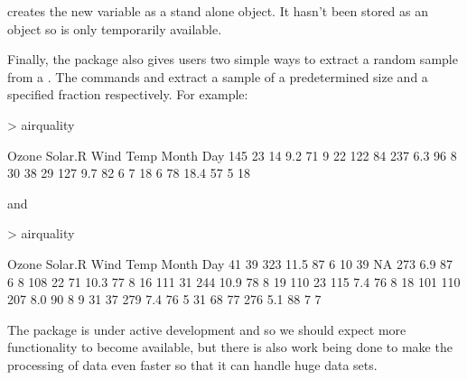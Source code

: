 creates the new variable as a stand alone object. It hasn't been stored as an object so is only temporarily available.  
 
Finally, the  package also gives users two simple ways to extract a random sample from a . The commands  and   
extract a sample of a predetermined size and a specified fraction respectively. For example: 

\begin{Schunk}
\begin{Sinput}
> airquality %>% sample_n(4) 
\end{Sinput}
\begin{Soutput}
    Ozone Solar.R Wind Temp Month Day
145    23      14  9.2   71     9  22
122    84     237  6.3   96     8  30
38     29     127  9.7   82     6   7
18      6      78 18.4   57     5  18
\end{Soutput}
\end{Schunk}

 and 

\begin{Schunk}
\begin{Sinput}
> airquality %>% sample_frac(0.05) 
\end{Sinput}
\begin{Soutput}
    Ozone Solar.R Wind Temp Month Day
41     39     323 11.5   87     6  10
39     NA     273  6.9   87     6   8
108    22      71 10.3   77     8  16
111    31     244 10.9   78     8  19
110    23     115  7.4   76     8  18
101   110     207  8.0   90     8   9
31     37     279  7.4   76     5  31
68     77     276  5.1   88     7   7
\end{Soutput}
\end{Schunk}

 
The   package is under active development and so we should expect more functionality to become available, but there is also work being done to make the processing of data even faster so that it can handle huge data sets. 
 



